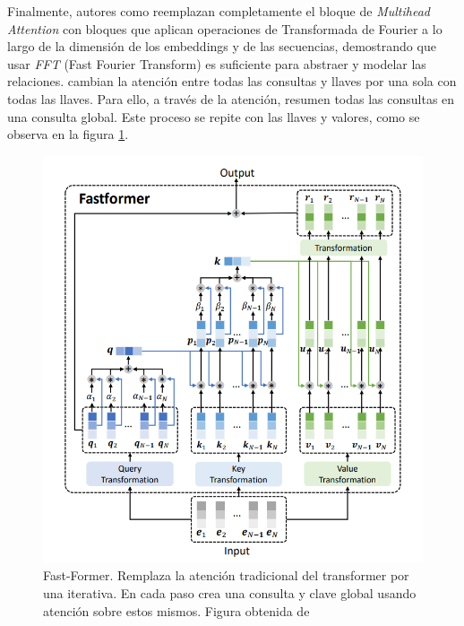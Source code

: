 Finalmente, autores como \citeauthor{DBLP:journals/corr/abs-2105-03824} reemplazan completamente
el bloque de \textit{Multihead Attention} con bloques que aplican operaciones de Transformada de
Fourier a lo largo de la dimensión de los embeddings y de las secuencias, demostrando que usar
\textit{FFT} (Fast Fourier Transform) es suficiente para abstraer y modelar las relaciones.
\citeauthor{DBLP:journals/corr/abs-2108-09084} cambian la atención entre todas las consultas
y llaves por una sola con todas las llaves. Para ello, a través de la atención, resumen todas las
consultas en una consulta global. Este proceso se repite con las llaves y valores, como se observa
en la figura \ref{fig:fast-former}.

\begin{figure}[ht!]
    \centering
    \includegraphics[width=0.6 \textwidth]{Chapters/2. Transformer/Figures/transformer/fastformer.png}
    \caption{Fast-Former. Remplaza la atención tradicional del  transformer por una iterativa. En
             cada paso crea una consulta y clave global usando atención sobre estos mismos.
             Figura obtenida de \cite{DBLP:journals/corr/abs-2108-09084}}
    \label{fig:fast-former}
\end{figure}
